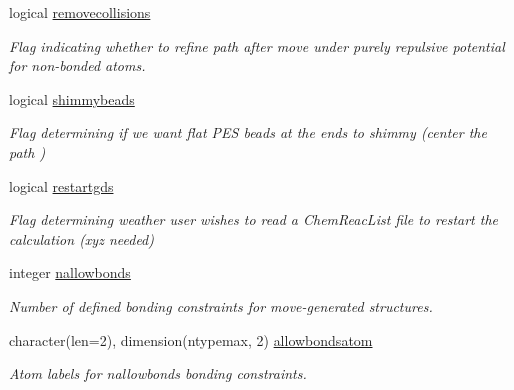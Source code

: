 \begin{DoxyCompactItemize}
logical \mbox{\hyperlink{namespaceglobaldata_aece6803e92a5587b17d4c456147be1be}{removecollisions}}
\begin{DoxyCompactList}\small\item\em Flag indicating whether to refine path after move under purely repulsive potential for non-\/bonded atoms. \end{DoxyCompactList}\item 
\mbox{\label{namespaceglobaldata_aca9c80ac9c053be8b3a8e24742fc337b}} 
logical \mbox{\hyperlink{namespaceglobaldata_aca9c80ac9c053be8b3a8e24742fc337b}{shimmybeads}}
\begin{DoxyCompactList}\small\item\em Flag determining if we want flat P\+ES beads at the ends to shimmy (center the path ) \end{DoxyCompactList}\item 
\mbox{\label{namespaceglobaldata_a311febfe7df75e5ac20d947e590c450f}} 
logical \mbox{\hyperlink{namespaceglobaldata_a311febfe7df75e5ac20d947e590c450f}{restartgds}}
\begin{DoxyCompactList}\small\item\em Flag determining weather user wishes to read a Chem\+Reac\+List file to restart the calculation (xyz needed) \end{DoxyCompactList}\item 
\mbox{\label{namespaceglobaldata_a36e333357984e52e80efdb18808898f7}} 
integer \mbox{\hyperlink{namespaceglobaldata_a36e333357984e52e80efdb18808898f7}{nallowbonds}}
\begin{DoxyCompactList}\small\item\em Number of defined bonding constraints for move-\/generated structures. \end{DoxyCompactList}\item 
\mbox{\label{namespaceglobaldata_ae352de78dc04b239b3b03d375ea39aae}} 
character(len=2), dimension(ntypemax, 2) \mbox{\hyperlink{namespaceglobaldata_ae352de78dc04b239b3b03d375ea39aae}{allowbondsatom}}
\begin{DoxyCompactList}\small\item\em Atom labels for nallowbonds bonding constraints. \end{DoxyCompactList}\item 

\end{DoxyCompactItemize}
